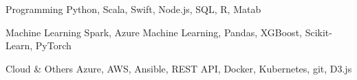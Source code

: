 \begin{cvskills}

  \cvskill
    {Programming}
    {Python, Scala, Swift, Node.js, SQL, R, Matab}

  \cvskill
    {Machine Learning}
    {Spark, Azure Machine Learning, Pandas, XGBoost, Scikit-Learn, PyTorch}

  \cvskill
    {Cloud \& Others}
    {Azure, AWS, Ansible, REST API, Docker, Kubernetes, git, D3.js}

\end{cvskills}
